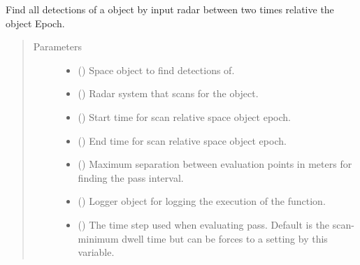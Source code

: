 \documentclass[letterpaper,10pt,english]{sphinxmanual}
\begin{document}
\begin{fulllineitems}
\label{\detokenize{modules/simulate_scan:simulate_scan.get_detections}}
Find all detections of a object by input radar between two times relative the object Epoch.
\begin{quote}\begin{description}
\item[{Parameters}] \leavevmode\begin{itemize}
\item {} 
 ({\hyperref[\detokenize{modules/space_object:space_object.SpaceObject}]{}}) \textendash{} Space object to find detections of.

\item {} 
 ({\hyperref[\detokenize{modules/radar_config:radar_config.RadarSystem}]{}}) \textendash{} Radar system that scans for the object.

\item {} 
 () \textendash{} Start time for scan relative space object epoch.

\item {} 
 () \textendash{} End time for scan relative space object epoch.

\item {} 
 () \textendash{} Maximum separation between evaluation points in meters for finding the pass interval.

\item {} 
 () \textendash{} Logger object for logging the execution of the function.

\item {} 
 () \textendash{} The time step used when evaluating pass. Default is the scan-minimum dwell time but can be forces to a setting by this variable.


\end{itemize}
\end{description}
\end{quote}
\end{fulllineitems}
\end{document}
